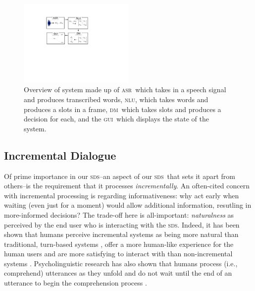 \documentclass[11pt]{article}
\newcommand{\sds}[0]{\textsc{sds}}
\newcommand{\nlu}[0]{\textsc{nlu}}
\newcommand{\asr}[0]{\textsc{asr}}
\newcommand{\dm}[0]{\textsc{dm}}
\newcommand{\ui}[0]{\textsc{gui}}
\begin{document}
\begin{figure}[ht]
  \centering
      \includegraphics[width=0.5\textwidth]{figures/sig16-overview.pdf}	
      \caption{Overview of system made up of \asr\ which takes in a speech signal and produces transcribed words, \nlu, which takes words and produces a slots in a frame, \dm\ which takes slots and produces a decision for each, and the \ui\ which displays the state of the system. \label{fig:overview}}
\end{figure}


\subsection{Incremental Dialogue}

Of prime importance in our \sds--an aspect of our \sds\ that sets it apart from others--is the requirement that it processes \emph{incrementally}. An often-cited concern with incremental processing is regarding informativeness: why act early when waiting (even just for a moment) would allow additional information, resutling in more-informed decisions? The trade-off here is all-important: \emph{naturalness} as perceived by the end user who is interacting with the \sds. Indeed, it has been shown that humans perceive incremental systems as being more natural than traditional, turn-based systems \cite{Aist2006,Skantze2009,skantze2010sigdial,Asri2014}, offer a more human-like experience for the human users \cite{Edlund2008b} and are more satisfying to interact with than non-incremental systems \cite{Aistetal:incrunder-short}. Psycholinguistic research has also shown that humans process (i.e., comprehend) utterances as they unfold and do not wait until the end of an utterance to begin the comprehension process \cite{Tanenhaus1995,Spivey_2002tw}. 
\end{document}
